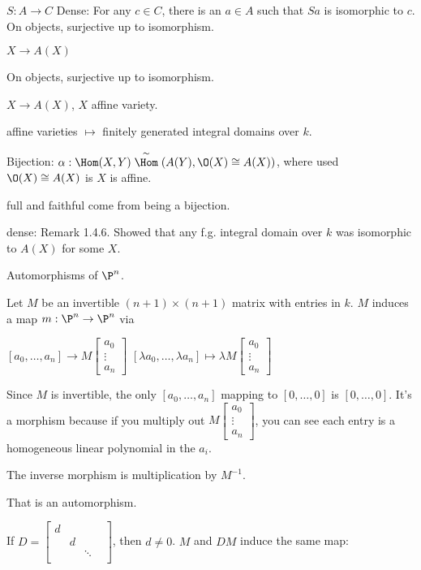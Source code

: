
$S: A \to C$
Dense: For any $c \in C$, there is an $a \in A$ such that $Sa$ is isomorphic to $c$.
On objects, surjective up to isomorphism. 


$X \to A(X)$

On objects, surjective up to isomorphism.

$X \to A(X)$, $X$ affine variety. 

affine varieties $\mapsto$ finitely generated integral domains over $k$.

Bijection: $\alpha: \Hom(X,Y) \stackrel{\sim} \Hom(A(Y),\O(X) \cong A(X))$, where used $\O(X) \cong A(X)$ is $X$ is affine. 

full and faithful come from being a bijection.

dense: Remark 1.4.6. Showed that any f.g. integral domain over $k$ was isomorphic to $A(X)$ for some $X$.





Automorphisms of $\P^n$.

Let $M$ be an invertible $(n+1) \times (n+1)$ matrix with entries in $k$. $M$ induces a map $m: \P^n \to \P^n$ via 

$[a_0,\ldots,a_n] \to M \begin{bmatrix} a_0 \\ \vdots \\ a_n \end{bmatrix}$
$[\lambda a_0, \ldots, \lambda a_n] \mapsto \lambda M \begin{bmatrix} a_0 \\ \vdots \\ a_n \end{bmatrix}$

Since $M$ is invertible, the only $[a_0,\ldots,a_n]$ mapping to $[0,\ldots,0]$ is $[0,\ldots,0]$. It's a morphism because if you multiply out $M \begin{bmatrix} a_0 \\ \vdots \\ a_n \end{bmatrix}$, you can see each entry is a homogeneous linear polynomial in the $a_i$.

The inverse morphism is multiplication by $M^{-1}$.

That is an automorphism.

If $D= \begin{bmatrix} d & & & \\ & d & & \\ & & \ddots & \\ \end{bmatrix}$, then $d \neq 0$. $M$ and $DM$ induce the same map: 

